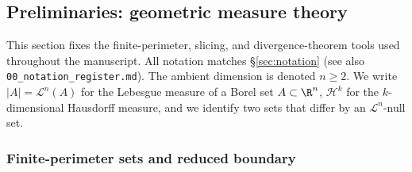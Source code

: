 %
%
%
%

\subsection{Preliminaries: geometric measure theory}\label{sec:prelim-gmt}

This section fixes the finite-perimeter, slicing, and divergence-theorem
tools used throughout the manuscript.  All notation matches
\S\ref{sec:notation} (see also \texttt{00\_notation\_register.md}).
The ambient dimension is denoted $n\ge 2$.  We write $|A|=\mathcal L^n(A)$
for the Lebesgue measure of a Borel set $A\subset\R^n$,
$\mathcal H^k$ for the $k$-dimensional Hausdorff measure, and we
identify two sets that differ by an $\mathcal L^n$-null set.

\subsubsection{Finite-perimeter sets and reduced boundary}
\label{ssec:prelim-fp}

